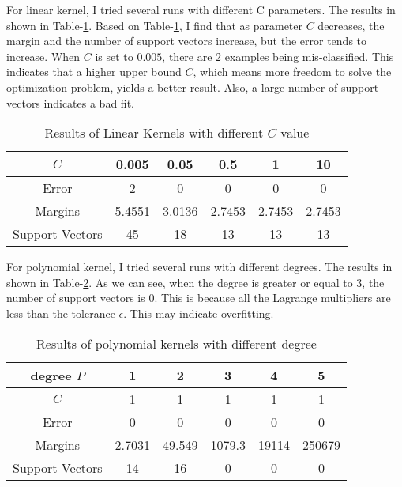 \documentclass[12pt]{article}
\begin{document}
For linear kernel, I tried several runs with different C parameters. The results in shown in Table-\ref{tab:linear}. Based on Table-\ref{tab:linear}, I find that as parameter $C$ decreases, the margin and the number of support vectors increase, but the error tends to increase. When $C$ is set to $0.005$, there are 2 examples being mis-classified. This indicates that a  higher upper bound $C$, which means more freedom to solve the optimization problem, yields a better result. Also, a large number of support vectors indicates a bad fit. \\

\begin{table}[ht!]
  \begin{center}
    \begin{tabular}{|c|c|c|c|c|c|}
      \hline
      $C$	  &  0.005 &  0.05  &   0.5  &    1   &  10    \\ \hline
      Error       &    2   &   0    &    0   &    0   &   0    \\ \hline
      Margins     & 5.4551 & 3.0136 & 2.7453 & 2.7453 & 2.7453 \\ \hline
      Support Vectors & 45 &  18    &   13   &   13   &   13   \\ \hline
    \end{tabular}
  \end{center}
  \caption{Results of Linear Kernels with different $C$ value 
    \label{tab:linear}}
\end{table}

For polynomial kernel, I tried several runs with different degrees. The results in shown in Table-\ref{tab:poly}. As we can see, when the degree is greater or equal to 3, the number of support vectors is 0. This is because all the Lagrange multipliers are less than the tolerance $\epsilon$. This may indicate overfitting. \\

\begin{table}[ht!]
  \begin{center}
    \begin{tabular}{|c|c|c|c|c|c|}
      \hline
      degree $P$  &    1   &   2    &    3   &    4   &   5    \\ \hline
      $C$         &    1   &   1    &    1   &    1   &   1    \\ \hline
      Error       &    0   &   0    &    0   &    0   &   0    \\ \hline
      Margins     & 2.7031 & 49.549 & 1079.3 & 19114  & 250679 \\ \hline
      Support Vectors & 14 &  16    &    0   &    0   &   0    \\ \hline
    \end{tabular}
  \end{center}
  \caption{Results of polynomial kernels with different degree 
    \label{tab:poly}}
\end{table}
\end{document}
